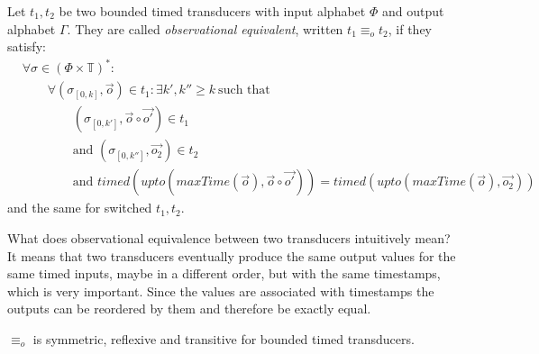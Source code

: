 \begin{definition}[name = Observational Equivalence]\label{def:observational_equivalence}
  Let \(t_1, t_2\) be two bounded timed transducers with input alphabet \(\Phi\) and output alphabet \(\Gamma\).
  They are called \emph{observational equivalent}, written \(t_1 \equiv_o t_2\), if they satisfy:
  \begin{align*}
    &\forall \sigma \in {(\Phi\times\mathbb{T})}^*:\\
    &\hspace{2em}\forall (\sigma_{[0,k]}, \vec{o}) \in t_1: \exists k', k'' \geq k\ \text{such that}\\
    &\hspace{4em}(\sigma_{[0,k']}, \vec{o} \circ \vec{o'}) \in t_1\\
    &\hspace{4em}\text{and } (\sigma_{[0,k'']}, \vec{o_2}) \in t_2\\
    &\hspace{4em}\text{and } \mathit{timed}(\mathit{upto}(\mathit{maxTime}(\vec{o}),\vec{o} \circ \vec{o'} )) = \mathit{timed}(\mathit{upto}(\mathit{maxTime}(\vec{o}),\vec{o_2}))
  \end{align*}
  and the same for switched \(t_1, t_2\).
\end{definition}

What does observational equivalence between two transducers intuitively mean?
It means that two transducers eventually produce the same output values for the same timed inputs, maybe in a different order, but with the same timestamps, which is very important.
Since the values are associated with timestamps the outputs can be reordered by them and therefore be exactly equal.

\begin{lemma}[name=Observational Equivalence is an Equivalence Relationship for Bounded Transducers]\label{lemma:observational_equivalence_equivalence_relationship}
  \(\equiv_o\) is symmetric, reflexive and transitive for bounded timed transducers.
\end{lemma}
\clearpage

